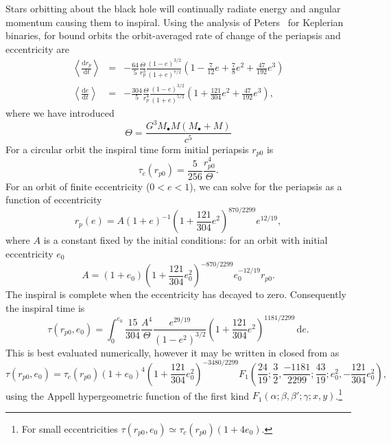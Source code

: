 \documentclass[useAMS,usenatbib]{mn2e}
\newcommand{\dd}{\ensuremath{\mathrm{d}}}
\newcommand{\diff}[2]{\ensuremath{\frac{\dd {#1}}{\dd {#2}}}}
\newcommand{\intd}[4]{\ensuremath{\int_{#1}^{#2}{#3}\,\dd{#4}}}
\begin{document}
Stars orbitting about the black hole will continually radiate energy and angular momentum causing them to inspiral. Using the analysis of Peters~\cite{Peters1964} for Keplerian binaries, for bound orbits the orbit-averaged rate of change of the periapsis and eccentricity are
\begin{eqnarray}
\left\langle\diff{r_p}{t}\right\rangle & = & -\frac{64}{5}\frac{\Theta}{r_p^3}\frac{(1 - e)^{3/2}}{(1 + e)^{7/2}}\left(1 - \frac{7}{12}e + \frac{7}{8}e^2 + \frac{47}{192}e^3\right) \\
\left\langle\diff{e}{t}\right\rangle & = & -\frac{304}{5}\frac{\Theta}{r_p^4}\frac{(1 - e)^{3/2}}{(1 + e)^{5/2}}\left(1 + \frac{121}{304}e^2 + \frac{47}{192}e^3\right),
\end{eqnarray}
where we have introduced
\begin{equation}
\Theta = \frac{G^3M_\bullet M(M_\bullet + M)}{c^5}
\end{equation}
For a circular orbit the inspiral time form initial periapsis $r_{p0}$ is
\begin{equation}
\tau_c(r_{p0}) = \frac{5}{256}\frac{r_{p0}^4}{\Theta}.
\end{equation}
For an orbit of finite eccentricity ($0 < e < 1$), we can solve for the periapsis as a function of eccentricity
\begin{equation}
r_p(e) = A(1 + e)^{-1}\left(1 + \frac{121}{304}e^2\right)^{870/2299}e^{12/19},
\end{equation}
where $A$ is a constant fixed by the initial conditions: for an orbit with initial eccentricity $e_0$
\begin{equation}
A = (1 + e_0)\left(1 + \frac{121}{304}e_0^2\right)^{-870/2299}e_0^{-12/19}r_{p0}.
\end{equation}
The inspiral is complete when the eccentricity has decayed to zero. Consequently the inspiral time is
\begin{equation}
\tau(r_{p0},e_0) = \intd{0}{e_0}{\frac{15}{304}\frac{A^4}{\Theta}\frac{e^{29/19}}{(1-e^2)^{3/2}}\left(1 + \frac{121}{304}e^2\right)^{1181/2299}}{e}.
\end{equation}
This is best evaluated numerically, however it may be written in closed from as
\begin{equation}
\tau(r_{p0},e_0) = \tau_c(r_{p0})(1 + e_0)^4\left(1 + \frac{121}{304}e_0^2\right)^{-3480/2299}F_1\left(\frac{24}{19};\frac{3}{2},\frac{-1181}{2299};\frac{43}{19};e_0^2,-\frac{121}{304}e_0^2\right),
\end{equation}
using the Appell hypergeometric function of the first kind $F_1(\alpha;\beta,\beta';\gamma;x,y)$.\footnote{For small eccentricities $\tau(r_{p0},e_0) \simeq \tau_c(r_{p0})(1 + 4e_0)$.}
\end{document}
